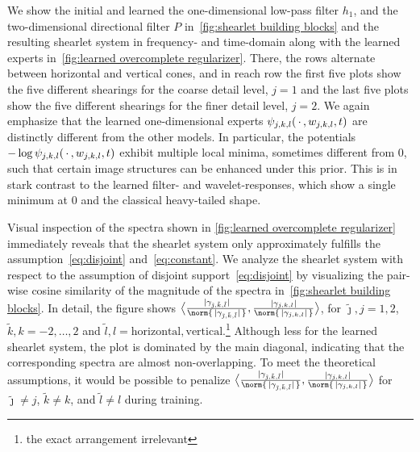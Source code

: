 We show the initial and learned the one-dimensional low-pass filter \( h_{\num{1}} \), and the two-dimensional directional filter \( P \) in~\cref{fig:shearlet building blocks} and the resulting shearlet system in frequency- and time-domain along with the learned experts in~\cref{fig:learned overcomplete regularizer}.
There, the rows alternate between horizontal and vertical cones, and in reach row the first five plots show the five different shearings for the coarse detail level, \( j = \num{1} \) and the last five plots show the five different shearings for the finer detail level, \( j = \num{2} \).
We again emphasize that the learned one-dimensional experts \( \psi_{j,k,l}(\,\cdot\,, w_{j,k,l}, t) \) are distinctly different from the other models.
In particular, the potentials \( - \log \psi_{j,k,l}(\,\cdot\,, w_{j,k,l}, t) \) exhibit multiple local minima, sometimes different from \( \num{0} \), such that certain image structures can be enhanced under this prior.
This is in stark contrast to the learned filter- and wavelet-responses, which show a single minimum at \( \num{0} \) and the classical heavy-tailed shape.

Visual inspection of the spectra shown in \cref{fig:learned overcomplete regularizer} immediately reveals that the shearlet system only approximately fulfills the assumption~\eqref{eq:disjoint} and~\eqref{eq:constant}.
We analyze the shearlet system with respect to the assumption of disjoint support~\eqref{eq:disjoint} by visualizing the pair-wise cosine similarity of the magnitude of the spectra in~\cref{fig:shearlet building blocks}.
In detail, the figure shows \( \bigl\langle \frac{|\gamma_{\tilde{\jmath},\tilde{k},\tilde{l}}|}{\norm{\,|\gamma_{\tilde{\jmath},\tilde{k},\tilde{l}}|\,}}, \frac{|\gamma_{j,k,l}|}{\norm{\,|\gamma_{j,k,l}|\,}} \bigr\rangle \), for \( \tilde{\jmath}, j = \num{1}, \num{2} \), \( \tilde{k}, k = -\num{2}, \dotsc, \num{2} \) and \( \tilde{l}, l = \text{horizontal}, \text{vertical} \).\footnote{the exact arrangement irrelevant}
Although less for the learned shearlet system, the plot is dominated by the main diagonal, indicating that the corresponding spectra are almost non-overlapping.
To meet the theoretical assumptions, it would be possible to penalize \( \bigl\langle \frac{|\gamma_{\tilde{\jmath},\tilde{k},\tilde{l}}|}{\norm{\,|\gamma_{\tilde{\jmath},\tilde{k},\tilde{l}}|\,}}, \frac{|\gamma_{j,k,l}|}{\norm{\,|\gamma_{j,k,l}|\,}} \bigr\rangle \) for  \( \tilde\jmath \neq j \), \( \tilde{k} \neq k \), and \( \tilde{l} \neq l \) during training.

